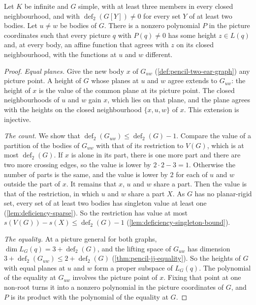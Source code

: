 \begin{lemma}
  \label{lem:pencil-x0-planes-separate}
  \leanok
  Let $K$ be infinite and $G$ simple, with at least three members in
  every closed neighbourhood, and with $\operatorname{def}_2(G[Y]) \ne 0$
  for every set $Y$ of at least two bodies. Let $u \ne w$ be bodies of
  $G$. There is a nonzero polynomial $P$ in the picture coordinates such
  that every picture $q$ with $P(q) \ne 0$ has some height $z \in L(q)$
  and, at every body, an affine function that agrees with $z$ on its
  closed neighbourhood, with the functions at $u$ and $w$ different.
\end{lemma}
\begin{proof}
  \leanok
  \emph{Equal planes.} Give the new body $x$ of $G_{uw}$
  (\cref{def:pencil-two-ear-graph}) any picture point. A height of $G$
  whose planes at $u$ and $w$ agree extends to $G_{uw}$: the height of
  $x$ is the value of the common plane at its picture point. The closed
  neighbourhoods of $u$ and $w$ gain $x$, which lies on that plane, and
  the plane agrees with the heights on the closed neighbourhood
  $\{x, u, w\}$ of $x$. This extension is injective.

  \emph{The count.} We show that $\operatorname{def}_2(G_{uw}) \le
  \operatorname{def}_2(G) - 1$. Compare the value of a partition of the
  bodies of $G_{uw}$ with that of its restriction to $V(G)$, which is at
  most $\operatorname{def}_2(G)$. If $x$ is alone in its part, there is
  one more part and there are two more crossing edges, so the value is
  lower by $2 \cdot 2 - 3 = 1$. Otherwise the number of parts is the
  same, and the value is lower by $2$ for each of $u$ and $w$ outside the
  part of $x$. It remains that $x$, $u$ and $w$ share a part. Then the
  value is that of the restriction, in which $u$ and $w$ share a part
  $X$. As $G$ has no planar-rigid set, every set of at least two bodies
  has singleton value at least one (\cref{lem:deficiency-sparse}). So the
  restriction has value at most
  $s(V(G)) - s(X) \le \operatorname{def}_2(G) - 1$
  (\cref{lem:deficiency-singleton-bound}).

  \emph{The equality.} At a picture general for both graphs,
  $\dim L_G(q) = 3 + \operatorname{def}_2(G)$, and the lifting space of
  $G_{uw}$ has dimension
  $3 + \operatorname{def}_2(G_{uw}) \le 2 + \operatorname{def}_2(G)$
  (\cref{thm:pencil-jj-equality}). So
  the heights of $G$ with equal planes at $u$ and $w$ form a proper
  subspace of $L_G(q)$. The polynomial of the equality at $G_{uw}$
  involves the picture point of $x$. Fixing that point at one non-root
  turns it into a nonzero polynomial in the picture coordinates of $G$,
  and $P$ is its product with the polynomial of the equality at $G$.
\end{proof}

